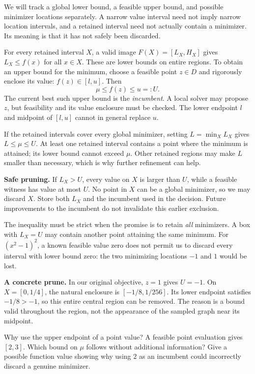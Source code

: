 We will track a global lower bound, a feasible upper bound, and possible
minimizer locations separately. A narrow value interval need not imply
narrow location intervals, and a retained interval need not actually contain
a minimizer. Its meaning is that it has not safely been discarded.

\newpage
{}
For every retained interval $X$, a valid image $F(X)=[L_X,H_X]$ gives
$L_X\le f(x)$ for all $x\in X$. These are lower bounds on entire regions.
To obtain an upper bound for the minimum, choose a feasible point $z\in D$
and rigorously enclose its value: $f(z)\in[l,u]$. Then
\[
                        \mu\le f(z)\le u=:U.
\]
The current best such upper bound is the \emph{incumbent}. A local solver
may propose $z$, but feasibility and its value enclosure must be checked.
The lower endpoint $l$ and midpoint of $[l,u]$ cannot in general replace $u$.

If the retained intervals cover every global minimizer, setting
$L=\min_X L_X$ gives $L\le\mu\le U$. At least one retained interval
contains a point where the minimum is attained; its lower bound cannot
exceed $\mu$. Other retained regions may make $L$ smaller than necessary,
which is why further refinement can help.

\textbf{Safe pruning.} If $L_X>U$, every value on $X$ is larger than
$U$, while a feasible witness has value at most $U$. No point in $X$ can
be a global minimizer, so we may discard $X$. Store both $L_X$ and the
incumbent used in the decision. Future improvements to the incumbent do
not invalidate this earlier exclusion.

The inequality must be strict when the promise is to retain \emph{all}
minimizers. A box with $L_X=U$ may contain another point attaining the same
minimum. For $(x^2-1)^2$, a known feasible value zero does not permit us
to discard every interval with lower bound zero: the two minimizing
locations $-1$ and $1$ would be lost.

\textbf{A concrete prune.} In our original objective, $z=1$ gives $U=-1$.
On $X=[0,1/4]$, the natural enclosure is $[-1/8,1/256]$. Its lower
endpoint satisfies $-1/8>-1$, so this entire central region can be removed.
The reason is a bound valid throughout the region, not the appearance of
the sampled graph near its midpoint.

\begin{question}{Why use the upper endpoint of a point value?}
A feasible point evaluation gives $[2,3]$. Which bound on $\mu$ follows
without additional information? Give a possible function value showing why
using $2$ as an incumbent could incorrectly discard a genuine minimizer.
\end{question}

